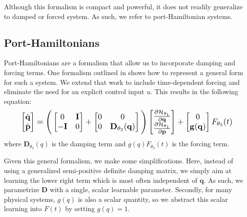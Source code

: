 \documentclass[twoside]{article}
\begin{document}
Although this formalism is compact and powerful, it does not readily generalize to damped or forced system. As such, we refer to port-Hamiltonian systems.

\subsection{Port-Hamiltonians}

Port-Hamiltonians are a formalism that allow us to incorporate damping and forcing terms. One formalism outlined in \cite{dissipative sympoden} shows how to represent a general form for such a system. We extend that work to include time-dependent forcing and eliminate the need for an explicit control input $u$. This results in the following equation:
\begin{equation}
\resizebox{0.9\linewidth}{!}{$%
\begin{bmatrix}
\dot{\mathbf{q}} \\
\dot{\mathbf{p}}
\end{bmatrix}
=
\Bigg(\begin{bmatrix}
0 & \mathbf{I} \\
-\mathbf{I} & 0
\end{bmatrix} +
\begin{bmatrix}
0 & 0 \\
0 & \mathbf{D}_{\theta_2}(\mathbf{q})
\end{bmatrix}
 \Bigg)
 \begin{bmatrix}
\frac{\partial \mathcal{H}_{\theta_1}}{\partial \mathbf{q}} \\
\frac{\partial \mathcal{H}_{\theta_1}}{\partial \mathbf{p}}
\end{bmatrix}
+
\begin{bmatrix}
0 \\
\mathbf{g}(\mathbf{q})
\end{bmatrix}
F_{\theta_3}(t)
$%
}%
\end{equation}
where $\mathbf{D}_{\theta_2}(q)$ is the damping term and $g(q)F_{\theta_3}(t)$ is the forcing term. 

Given this general formalism, we make some simplifications. Here, instead of using a generalized semi-positive definite damping matrix, we simply aim at learning the lower right term which is most often independent of $\mathbf{q}$. As such, we parametrize $\mathbf{D}$ with a single, scalar learnable parameter. Secondly, for many physical systems, $g(q)$ is also a scalar quantity, so we abstract this scalar learning into $F(t)$ by setting $g(q) = 1$.
\end{document}
